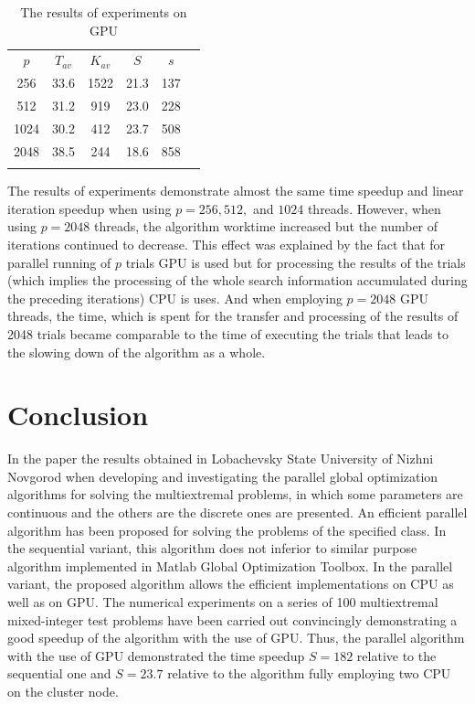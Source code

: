 \documentclass{llncs}
\begin{document}
\begin{table}
	\caption{The results of experiments on GPU}
	\label{tab:3}
	\center
	\begin{tabular}{cccccc}
		\hline\noalign{\smallskip}
			$p$ & $T_{av}$ & $K_{av}$ & $S$ & $s$ \\
	\noalign{\smallskip} \hline \noalign{\smallskip}
	256 \;&	33.6 \; & 1522\;  & 21.3 \; & 137  \\
	512 \;&	31.2 \; & 919 \;  & 23.0 \; & 228  \\
	1024\;& 30.2 \; & 412 \; & 23.7  \; & 508  \\
	2048\;& 38.5 \; & 244 \; & 18.6  \; & 858  \\
		\noalign{\smallskip}\hline
	\end{tabular}
\end{table}

The results of experiments demonstrate almost the same time speedup and linear iteration 
speedup when using $p=256, 512,$ and $1024$ threads. However, when using $p=2048$ 
threads, the algorithm worktime increased but the number of iterations continued to decrease. 
This effect was explained by the fact that for parallel running of $p$ trials GPU is used but for 
processing the results of the trials (which implies the processing of the whole search information 
accumulated during the preceding iterations) CPU is uses. And when employing $p=2048$ 
GPU threads, the time, which is spent for the transfer and processing of the results of 2048 
trials became comparable to the time of executing the trials that leads to the slowing down of 
the algorithm as a whole.


\section{Conclusion}
In the paper the results obtained in Lobachevsky State University of Nizhni Novgorod 
when developing and investigating the parallel global optimization algorithms for solving the 
multiextremal problems, in which some parameters are continuous and the others are the discrete 
ones are presented. 
An efficient parallel algorithm has been proposed for solving the problems of the specified class. 
In the sequential variant, this algorithm does not inferior to similar purpose algorithm 
implemented in Matlab Global Optimization Toolbox.
In the parallel variant, the proposed algorithm allows the efficient implementations on CPU as 
well as on GPU. 
The numerical experiments on a series of 100 multiextremal mixed-integer test problems have been carried out 
convincingly demonstrating a good speedup of the algorithm with the use of GPU.
Thus, the parallel algorithm with the use of GPU demonstrated the time speedup $S = 182$ 
relative to the sequential one and $S = 23.7$ relative to the algorithm fully employing two CPU on 
the cluster node.
\end{document}
